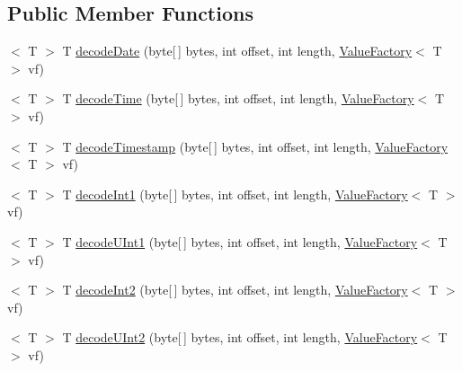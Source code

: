 \subsection*{Public Member Functions}
\begin{DoxyCompactItemize}
\item 
$<$ T $>$ T \mbox{\hyperlink{interfacecom_1_1mysql_1_1cj_1_1protocol_1_1_value_decoder_a177b8606021001ade615407b55126bf7}{decode\+Date}} (byte\mbox{[}$\,$\mbox{]} bytes, int offset, int length, \mbox{\hyperlink{interfacecom_1_1mysql_1_1cj_1_1result_1_1_value_factory}{Value\+Factory}}$<$ T $>$ vf)
\item 
$<$ T $>$ T \mbox{\hyperlink{interfacecom_1_1mysql_1_1cj_1_1protocol_1_1_value_decoder_a242096fdfd3239b74372b3ebb5ef1a15}{decode\+Time}} (byte\mbox{[}$\,$\mbox{]} bytes, int offset, int length, \mbox{\hyperlink{interfacecom_1_1mysql_1_1cj_1_1result_1_1_value_factory}{Value\+Factory}}$<$ T $>$ vf)
\item 
$<$ T $>$ T \mbox{\hyperlink{interfacecom_1_1mysql_1_1cj_1_1protocol_1_1_value_decoder_ac5b96aab39f519a84f5b1a09109cf9c0}{decode\+Timestamp}} (byte\mbox{[}$\,$\mbox{]} bytes, int offset, int length, \mbox{\hyperlink{interfacecom_1_1mysql_1_1cj_1_1result_1_1_value_factory}{Value\+Factory}}$<$ T $>$ vf)
\item 
$<$ T $>$ T \mbox{\hyperlink{interfacecom_1_1mysql_1_1cj_1_1protocol_1_1_value_decoder_a643bd8a81729e75139130855c361ee44}{decode\+Int1}} (byte\mbox{[}$\,$\mbox{]} bytes, int offset, int length, \mbox{\hyperlink{interfacecom_1_1mysql_1_1cj_1_1result_1_1_value_factory}{Value\+Factory}}$<$ T $>$ vf)
\item 
$<$ T $>$ T \mbox{\hyperlink{interfacecom_1_1mysql_1_1cj_1_1protocol_1_1_value_decoder_aa626496cf5956d94b25d27615093efc5}{decode\+U\+Int1}} (byte\mbox{[}$\,$\mbox{]} bytes, int offset, int length, \mbox{\hyperlink{interfacecom_1_1mysql_1_1cj_1_1result_1_1_value_factory}{Value\+Factory}}$<$ T $>$ vf)
\item 
$<$ T $>$ T \mbox{\hyperlink{interfacecom_1_1mysql_1_1cj_1_1protocol_1_1_value_decoder_abe158670a28e6976e124afee59423762}{decode\+Int2}} (byte\mbox{[}$\,$\mbox{]} bytes, int offset, int length, \mbox{\hyperlink{interfacecom_1_1mysql_1_1cj_1_1result_1_1_value_factory}{Value\+Factory}}$<$ T $>$ vf)
\item 
$<$ T $>$ T \mbox{\hyperlink{interfacecom_1_1mysql_1_1cj_1_1protocol_1_1_value_decoder_a57d0922a5efca890bb010f61a70974ed}{decode\+U\+Int2}} (byte\mbox{[}$\,$\mbox{]} bytes, int offset, int length, \mbox{\hyperlink{interfacecom_1_1mysql_1_1cj_1_1result_1_1_value_factory}{Value\+Factory}}$<$ T $>$ vf)

\end{DoxyCompactItemize}
